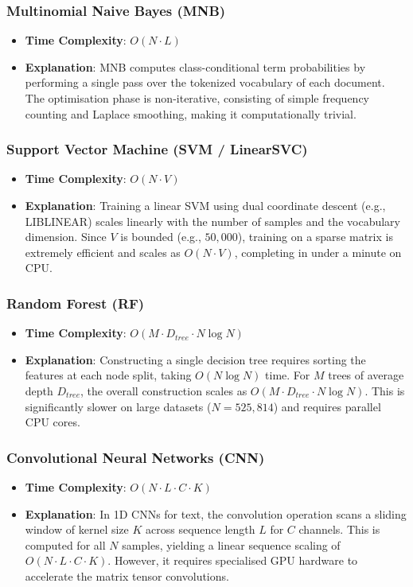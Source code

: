 \documentclass[11pt]{article}
\begin{document}
\subsubsection{Multinomial Naive Bayes (MNB)}
\begin{itemize}
    \item \textbf{Time Complexity}: $O(N \cdot L)$
    \item \textbf{Explanation}: MNB computes class-conditional term probabilities by performing a single pass over the tokenized vocabulary of each document. The optimisation phase is non-iterative, consisting of simple frequency counting and Laplace smoothing, making it computationally trivial.
\end{itemize}

\subsubsection{Support Vector Machine (SVM / LinearSVC)}
\begin{itemize}
    \item \textbf{Time Complexity}: $O(N \cdot V)$
    \item \textbf{Explanation}: Training a linear SVM using dual coordinate descent (e.g., LIBLINEAR) scales linearly with the number of samples and the vocabulary dimension. Since $V$ is bounded (e.g., $50,000$), training on a sparse matrix is extremely efficient and scales as $O(N \cdot V)$, completing in under a minute on CPU.
\end{itemize}

\subsubsection{Random Forest (RF)}
\begin{itemize}
    \item \textbf{Time Complexity}: $O(M \cdot D_{tree} \cdot N \log N)$
    \item \textbf{Explanation}: Constructing a single decision tree requires sorting the features at each node split, taking $O(N \log N)$ time. For $M$ trees of average depth $D_{tree}$, the overall construction scales as $O(M \cdot D_{tree} \cdot N \log N)$. This is significantly slower on large datasets ($N = 525,814$) and requires parallel CPU cores.
\end{itemize}

\subsubsection{Convolutional Neural Networks (CNN)}
\begin{itemize}
    \item \textbf{Time Complexity}: $O(N \cdot L \cdot C \cdot K)$
    \item \textbf{Explanation}: In 1D CNNs for text, the convolution operation scans a sliding window of kernel size $K$ across sequence length $L$ for $C$ channels. This is computed for all $N$ samples, yielding a linear sequence scaling of $O(N \cdot L \cdot C \cdot K)$. However, it requires specialised GPU hardware to accelerate the matrix tensor convolutions.
\end{itemize}
\end{document}
